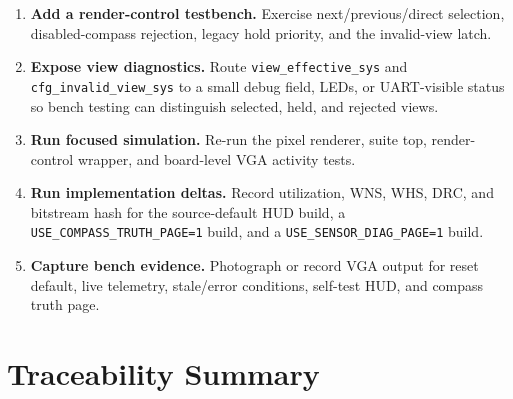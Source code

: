 \documentclass{article}
\newcommand{\sig}[1]{\begingroup\nolinkurl{#1}\endgroup}
\newcommand{\param}[1]{\begingroup\nolinkurl{#1}\endgroup}
\begin{document}
\begin{enumerate}
  \item \textbf{Add a render-control testbench.}  Exercise next/previous/direct
        selection, disabled-compass rejection, legacy hold priority, and the
        invalid-view latch.
  \item \textbf{Expose view diagnostics.}  Route \sig{view_effective_sys} and
        \sig{cfg_invalid_view_sys} to a small debug field, LEDs, or UART-visible
        status so bench testing can distinguish selected, held, and rejected
        views.
  \item \textbf{Run focused simulation.}  Re-run the pixel renderer, suite top,
        render-control wrapper, and board-level VGA activity tests.
  \item \textbf{Run implementation deltas.}  Record utilization, WNS, WHS, DRC,
        and bitstream hash for the source-default HUD build, a
        \param{USE_COMPASS_TRUTH_PAGE=1} build, and a
        \param{USE_SENSOR_DIAG_PAGE=1} build.
  \item \textbf{Capture bench evidence.}  Photograph or record VGA output for
        reset default, live telemetry, stale/error conditions, self-test HUD,
        and compass truth page.
\end{enumerate}

\section{Traceability Summary}
\end{document}
